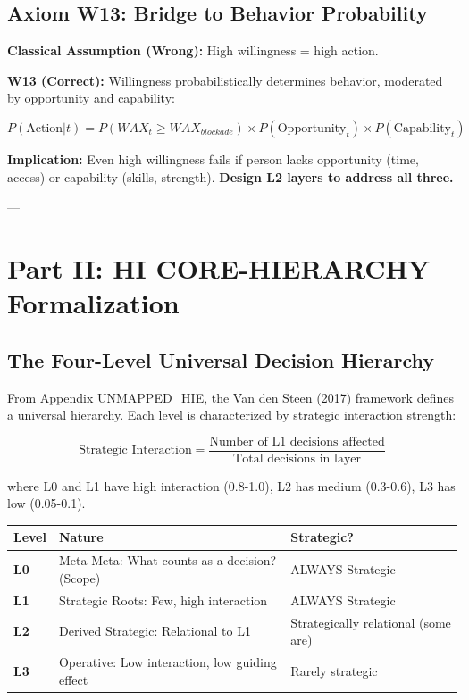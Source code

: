 \documentclass[11pt, a4paper]{article}
\begin{document}
\subsection{Axiom W13: Bridge to Behavior Probability} \label{sec:ch15-part1c}

\textbf{Classical Assumption (Wrong):} High willingness = high action.

\textbf{W13 (Correct):} Willingness probabilistically determines behavior, moderated by opportunity and capability:

$$P(\text{Action} | t) = P(WAX_t \geq WAX_{blockade}) \times P(\text{Opportunity}_t) \times P(\text{Capability}_t)$$

\textbf{Implication:} Even high willingness fails if person lacks opportunity (time, access) or capability (skills, strength). \textbf{Design L2 layers to address all three.}

---

\section{Part II: HI CORE-HIERARCHY Formalization}\label{sec:ch15-part2a}

\subsection{The Four-Level Universal Decision Hierarchy} \label{sec:ch15-part2a}

From Appendix UNMAPPED_HIE, the Van den Steen (2017) framework defines a universal hierarchy. Each level is characterized by strategic interaction strength:

\begin{equation}
\text{Strategic Interaction} = \frac{\text{Number of L1 decisions affected}}{\text{Total decisions in layer}}
\end{equation}

where L0 and L1 have high interaction (0.8-1.0), L2 has medium (0.3-0.6), L3 has low (0.05-0.1).

\begin{center}
\begin{tabular}{|l|p{5cm}|l|}
\hline
\textbf{Level} & \textbf{Nature} & \textbf{Strategic?} \\
\hline
\textbf{L0} & Meta-Meta: What counts as a decision? (Scope) & ALWAYS Strategic \\
\hline
\textbf{L1} & Strategic Roots: Few, high interaction & ALWAYS Strategic \\
\hline
\textbf{L2} & Derived Strategic: Relational to L1 & Strategically relational (some are) \\
\hline
\textbf{L3} & Operative: Low interaction, low guiding effect & Rarely strategic \\
\hline
\end{tabular}
\end{center}
\end{document}
